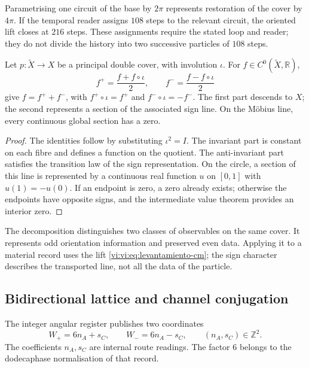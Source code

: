 Parametrising one circuit of the base by $2\pi$
represents restoration of the cover by $4\pi$. If the
temporal reader assigns $108$ steps to the relevant circuit, the
oriented lift closes at $216$ steps. These assignments
require the stated loop and reader; they do not divide the history into
two successive particles of $108$ steps.

\begin{proposition}
\label{vi:vi:prop:observables-paridad}
Let $p:\widetilde X\to X$ be a principal double cover, with
involution $\iota$. For $f\in C^0(\widetilde X,\mathbb R)$,
\[
 f^+=\frac{f+f\circ\iota}{2},\qquad
 f^-=\frac{f-f\circ\iota}{2}
\]
give $f=f^++f^-$, with $f^+\circ\iota=f^+$ and
$f^-\circ\iota=-f^-$. The first part descends to $X$; the
second represents a section of the associated sign line. On
the Möbius line, every continuous global section has a zero.
\end{proposition}
\begin{proof}
The identities follow by substituting $\iota^2=I$. The invariant
part is constant on each fibre and defines a function on the
quotient. The anti-invariant part satisfies the transition law
of the sign representation. On the circle, a section of this
line is represented by a continuous real function $u$ on $[0,1]$
with $u(1)=-u(0)$. If an endpoint is zero, a zero already exists; otherwise
the endpoints have opposite signs, and the intermediate value
theorem provides an interior zero.
\end{proof}

The decomposition distinguishes two classes of observables on the
same cover. It represents odd orientation information
and preserved even data. Applying it to a material record uses
the lift \eqref{vi:vi:eq:levantamiento-cm}; the sign character
describes the transported line, not all the data of the
particle.

\subsection{Bidirectional lattice and channel conjugation}
\label{vi:vi:subsec:reticulo-bidireccional}

The integer angular register publishes two coordinates
\begin{equation}
 W_+=6n_A+s_C,\qquad W_-=6n_A-s_C,
 \qquad (n_A,s_C)\in\mathbb Z^2.
 \label{vi:vi:eq:reticulo-ida-retorno}
\end{equation}
The coefficients $n_A,s_C$ are internal route readings. The factor
$6$ belongs to the dodecaphase normalisation of that record.

